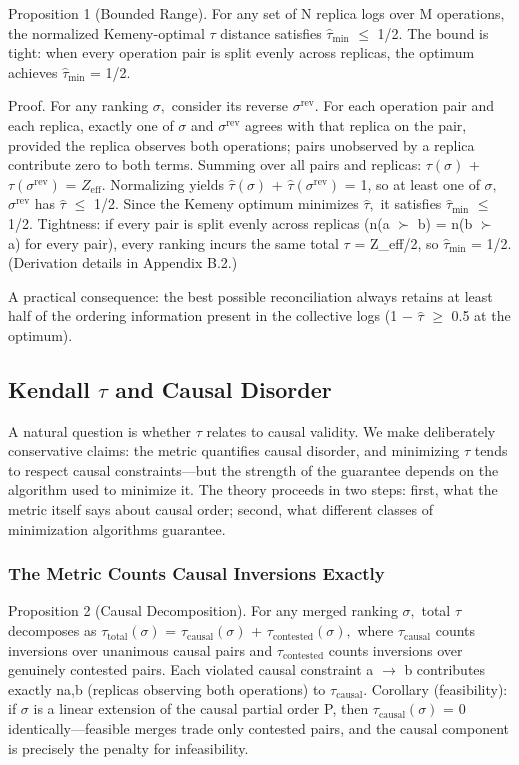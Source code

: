 \documentclass[11pt]{article}
\begin{document}
Proposition 1 (Bounded Range).  For any set of N replica logs over M operations, the normalized Kemeny-optimal $\tau $ distance satisfies $\hat{\tau}_{\mathrm{min}}$ $\leq $ 1/2. The bound is tight: when every operation pair is split evenly across replicas, the optimum achieves $\hat{\tau}_{\mathrm{min}}$ = 1/2.

Proof. For any ranking $\sigma ,$ consider its reverse $\sigma^{\mathrm{rev}}.$ For each operation pair and each replica, exactly one of $\sigma $ and $\sigma^{\mathrm{rev}}$ agrees with that replica on the pair, provided the replica observes both operations; pairs unobserved by a replica contribute zero to both terms. Summing over all pairs and replicas: $\tau (\sigma )$ + $\tau (\sigma^{\mathrm{rev}})$ = $Z_{\mathrm{eff}}.$ Normalizing yields $\hat{\tau}(\sigma )$ + $\hat{\tau}(\sigma^{\mathrm{rev}})$ = 1, so at least one of $\sigma ,$ $\sigma^{\mathrm{rev}}$ has $\hat{\tau}$ $\leq $ 1/2. Since the Kemeny optimum minimizes $\hat{\tau},$ it satisfies $\hat{\tau}_{\mathrm{min}}$ $\leq $ 1/2. Tightness: if every pair is split evenly across replicas (n(a $\succ $ b) = n(b $\succ $ a) for every pair), every ranking incurs the same total $\tau $ = Z\_eff/2, so $\hat{\tau}_{\mathrm{min}}$ = 1/2. (Derivation details in Appendix B.2.)

A practical consequence: the best possible reconciliation always retains at least half of the ordering information present in the collective logs (1 $-$ $\hat{\tau}$ $\geq $ 0.5 at the optimum).

\subsection{Kendall $\tau $ and Causal Disorder}
A natural question is whether $\tau $ relates to causal validity. We make deliberately conservative claims: the metric quantifies causal disorder, and minimizing $\tau $ tends to respect causal constraints—but the strength of the guarantee depends on the algorithm used to minimize it. The theory proceeds in two steps: first, what the metric itself says about causal order; second, what different classes of minimization algorithms guarantee.

\subsubsection{The Metric Counts Causal Inversions Exactly}
Proposition 2 (Causal Decomposition).  For any merged ranking $\sigma ,$ total $\tau $ decomposes as $\tau _{\mathrm{total}}(\sigma )$ = $\tau _{\mathrm{causal}}(\sigma )$ + $\tau _{\mathrm{contested}}(\sigma ),$ where $\tau _{\mathrm{causal}}$ counts inversions over unanimous causal pairs and $\tau _{\mathrm{contested}}$ counts inversions over genuinely contested pairs. Each violated causal constraint a $\rightarrow $ b contributes exactly na,b (replicas observing both operations) to $\tau _{\mathrm{causal}}.$ Corollary (feasibility): if $\sigma $ is a linear extension of the causal partial order P, then $\tau _{\mathrm{causal}}(\sigma )$ = 0 identically—feasible merges trade only contested pairs, and the causal component is precisely the penalty for infeasibility.
\end{document}
